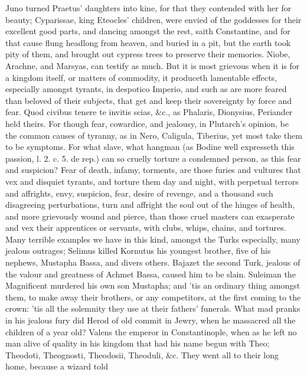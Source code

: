 {Juno turned Praetus' daughters into kine, for that they contended with
her for beauty; Cyparissae, king Eteocles' children, were envied
of the goddesses for their excellent good parts, and dancing amongst
the rest, saith Constantine, and for that cause flung headlong
from heaven, and buried in a pit, but the earth took pity of them, and
brought out cypress trees to preserve their memories. Niobe,
Arachne, and Marsyas, can testify as much. But it is most grievous when
it is for a kingdom itself, or matters of commodity, it produceth
lamentable effects, especially amongst tyrants, in despotico Imperio,
and such as are more feared than beloved of their subjects, that get
and keep their sovereignty by force and fear. Quod civibus tenere
te invitis scias, \&c., as Phalaris, Dionysius, Periander held theirs.
For though fear, cowardice, and jealousy, in Plutarch's opinion, be the
common causes of tyranny, as in Nero, Caligula, Tiberius, yet most take
them to be symptoms. For what slave, what hangman (as Bodine well
expresseth this passion, l. 2. c. 5. de rep.) can so cruelly torture a
condemned person, as this fear and suspicion? Fear of death, infamy,
torments, are those furies and vultures that vex and disquiet tyrants,
and torture them day and night, with perpetual terrors and affrights,
envy, suspicion, fear, desire of revenge, and a thousand such
disagreeing perturbations, turn and affright the soul out of the hinges
of health, and more grievously wound and pierce, than those cruel
masters can exasperate and vex their apprentices or servants, with
clubs, whips, chains, and tortures. Many terrible examples we have in
this kind, amongst the Turks especially, many jealous outrages;
Selimus killed Kornutus his youngest brother, five of his
nephews, Mustapha Bassa, and divers others. Bajazet the second
Turk, jealous of the valour and greatness of Achmet Bassa, caused him
to be slain. Suleiman the Magnificent murdered his own son
Mustapha; and 'tis an ordinary thing amongst them, to make away their
brothers, or any competitors, at the first coming to the crown: 'tis
all the solemnity they use at their fathers' funerals. What mad pranks
in his jealous fury did Herod of old commit in Jewry, when he massacred
all the children of a year old? Valens the emperor in
Constantinople, when as he left no man alive of quality in his kingdom
that had his name begun with Theo; Theodoti, Theognosti, Theodosii,
Theoduli, \&c. They went all to their long home, because a wizard told
}
